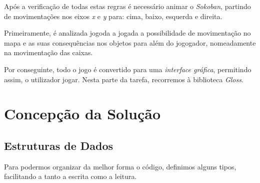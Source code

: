 \documentclass[12pt,a4paper]{report}
\begin{document}
Após a verificação de todas estas regras é necessário animar o \emph{Sokoban}, partindo de movimentações nos eixos \emph{x} e \emph{y} para: cima, baixo, esquerda e direita. 

Primeiramente, é analizada jogoda a jogada a possibilidade de movimentação no mapa e as suas consequências nos objetos para além do jogogador, nomeadamente na movimentação das caixas.

Por conseguinte, todo o jogo é convertido para uma \emph{interface gráfica}, permitindo assim, o utilizador jogar. Nesta parte da tarefa, recorremos à biblioteca \emph{Gloss}.



\newpage
\chapter{Concepção da Solução}
\section{Estruturas de Dados}

Para podermos organizar da melhor forma o código, definimos alguns tipos, facilitando a tanto a escrita como a leitura.
\end{document}
